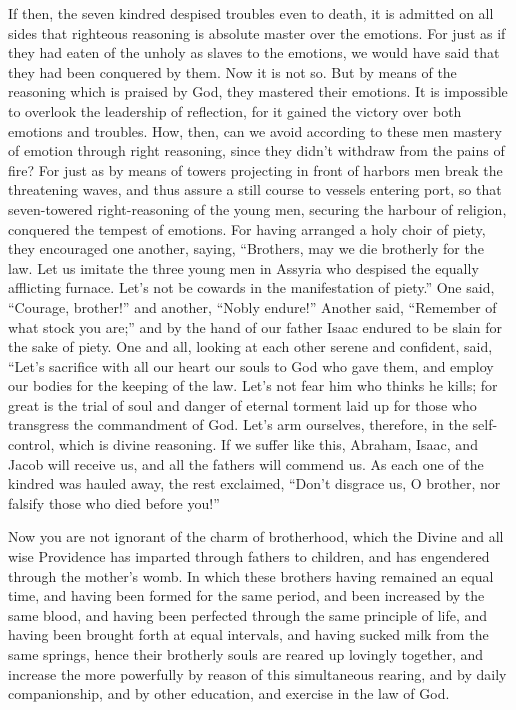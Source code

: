  If then, the seven kindred despised troubles even to death,
it is admitted on all sides that righteous reasoning is absolute master
over the emotions.  For just as if they had eaten of the
unholy as slaves to the emotions, we would have said that they had been
conquered by them.  Now it is not so. But by means of the
reasoning which is praised by God, they mastered their emotions.
 It is impossible to overlook the leadership of reflection,
for it gained the victory over both emotions and troubles. 
How, then, can we avoid according to these men mastery of emotion
through right reasoning, since they didn't withdraw from the pains of
fire?  For just as by means of towers projecting in front of
harbors men break the threatening waves, and thus assure a still course
to vessels entering port,  so that seven-towered
right-reasoning of the young men, securing the harbour of religion,
conquered the tempest of emotions.  For having arranged a
holy choir of piety, they encouraged one another, saying, 
``Brothers, may we die brotherly for the law. Let us imitate the three
young men in Assyria who despised the equally afflicting furnace.
 Let's not be cowards in the manifestation of piety.''
 One said, ``Courage, brother!'' and another, ``Nobly
endure!''  Another said, ``Remember of what stock you
are;'' and by the hand of our father Isaac endured to be slain for the
sake of piety.  One and all, looking at each other serene
and confident, said, ``Let's sacrifice with all our heart our souls to
God who gave them, and employ our bodies for the keeping of the law.
 Let's not fear him who thinks he kills;  for
great is the trial of soul and danger of eternal torment laid up for
those who transgress the commandment of God.  Let's arm
ourselves, therefore, in the self-control, which is divine reasoning.
 If we suffer like this, Abraham, Isaac, and Jacob will
receive us, and all the fathers will commend us.  As each
one of the kindred was hauled away, the rest exclaimed, ``Don't disgrace
us, O brother, nor falsify those who died before you!''

 Now you are not ignorant of the charm of brotherhood,
which the Divine and all wise Providence has imparted through fathers to
children, and has engendered through the mother's womb.  In
which these brothers having remained an equal time, and having been
formed for the same period, and been increased by the same blood, and
having been perfected through the same principle of life, 
and having been brought forth at equal intervals, and having sucked milk
from the same springs, hence their brotherly souls are reared up
lovingly together,  and increase the more powerfully by
reason of this simultaneous rearing, and by daily companionship, and by
other education, and exercise in the law of God.

